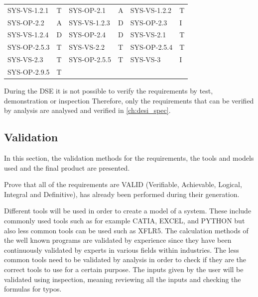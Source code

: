 \begin{table}[htb]
\begin{tabular}{ll|ll|ll}
SYS-VS-1.2.1            &T                          &SYS-OP-2.1              &A                       &SYS-VS-1.2.2            &T          \\\hdashline
SYS-OP-2.2              &A                       &SYS-VS-1.2.3            &D &SYS-OP-2.3              &I  \\\hdashline     
SYS-VS-1.2.4            &D                       &SYS-OP-2.4              &D                       &SYS-VS-2.1              &T          \\\hdashline
SYS-OP-2.5.3            &T                       &SYS-VS-2.2              &T          &SYS-OP-2.5.4            &T         \\\hdashline              
SYS-VS-2.3              &T          &SYS-OP-2.5.5            &T                       &SYS-VS-3                &I    \\\hdashline
SYS-OP-2.9.5 & T &&&&    \\
\bottomrule
\end{tabular}
\end{table}

During the DSE it is not possible to verify the requirements by test, demonstration or inspection Therefore, only the requirements that can be verified by analysis are analysed and verified in \autoref{ch:desi_spec}.

\subsection{Validation}
\label{sec:validation}

In this section, the validation methods for the requirements, the tools and models used and the final product are presented.

Prove that all of the requirements are VALID (Verifiable, Achievable, Logical, Integral and  Definitive), has already been performed during their generation. 

Different tools will be used in order to create a model of a system. These include commonly used tools such as for example CATIA, EXCEL, and PYTHON but also less common tools can be used such as XFLR5. The calculation methods of the well known programs are validated by experience since they have been continuously validated by experts in various fields within industries. The less common tools need to be validated by analysis in order to check if they are the correct tools to use for a certain purpose. The inputs given by the user will be validated using inspection, meaning reviewing all the inputs and checking the formulas for typos.

